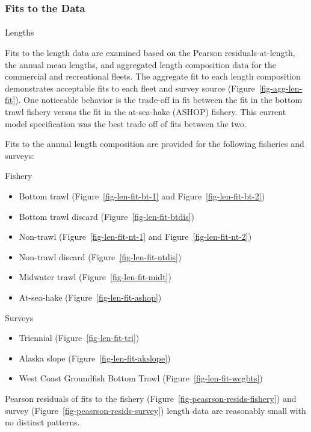 \documentclass[
]{scrartcl}
\makeatletter
\let\oldparagraph\paragraph
\renewcommand{\paragraph}{
    \@ifstar
      \xxxParagraphStar
      \xxxParagraphNoStar
  }
\newcommand{\xxxParagraphStar}[1]{\oldparagraph*{#1}\mbox{}}
\newcommand{\xxxParagraphNoStar}[1]{\oldparagraph{#1}\mbox{}}
\providecommand{\tightlist}{%
  \setlength{\itemsep}{0pt}\setlength{\parskip}{0pt}}\usepackage{longtable,booktabs,array}
\makeatother
\begin{document}
\subsubsection{Fits to the Data}\label{fits-to-the-data}

\paragraph{Lengths}\label{lengths}

Fits to the length data are examined based on the Pearson
residuals-at-length, the annual mean lengths, and aggregated length
composition data for the commercial and recreational fleets. The
aggregate fit to each length composition demonstrates acceptable fits to
each fleet and survey source (Figure~\ref{fig-agg-len-fit}). One
noticeable behavior is the trade-off in fit between the fit in the
bottom trawl fishery versus the fit in the at-sea-hake (ASHOP) fishery.
This current model specification was the best trade off of fits between
the two.

Fits to the annual length composition are provided for the following
fisheries and surveys:

Fishery

\begin{itemize}
\tightlist
\item
  Bottom trawl (Figure~\ref{fig-len-fit-bt-1} and
  Figure~\ref{fig-len-fit-bt-2})
\item
  Bottom trawl discard (Figure~\ref{fig-len-fit-btdis})
\item
  Non-trawl (Figure~\ref{fig-len-fit-nt-1} and
  Figure~\ref{fig-len-fit-nt-2})
\item
  Non-trawl discard (Figure~\ref{fig-len-fit-ntdis})
\item
  Midwater trawl (Figure~\ref{fig-len-fit-midt})
\item
  At-sea-hake (Figure~\ref{fig-len-fit-ashop})
\end{itemize}

Surveys

\begin{itemize}
\tightlist
\item
  Triennial (Figure~\ref{fig-len-fit-tri})
\item
  Alaska slope (Figure~\ref{fig-len-fit-akslope})
\item
  West Coast Groundfish Bottom Trawl (Figure~\ref{fig-len-fit-wcgbts})
\end{itemize}

Pearson residuals of fits to the fishery
(Figure~\ref{fig-peasrson-resids-fishery}) and survey
(Figure~\ref{fig-peasrson-resids-survey}) length data are reasonably
small with no distinct patterns.
\end{document}
